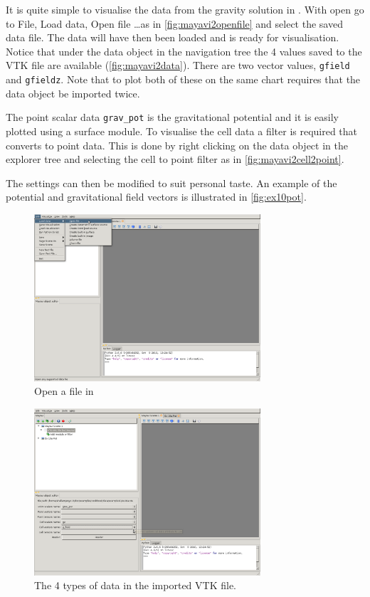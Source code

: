 It is quite simple to visualise the data from the gravity solution in \mayavi.
With \mayavi open go to File, Load data, Open file \ldots as in
\autoref{fig:mayavi2openfile} and select the saved data file. The data will
have then been loaded and is ready for visualisation. Notice that under the data
object in the \mayavi navigation tree the 4 values saved to the VTK file are
available (\autoref{fig:mayavi2data}). There are two vector values,
\verb|gfield| and \verb|gfieldz|. Note that to plot both of these on the same
chart requires that the data object be imported twice.

The point scalar data \verb|grav_pot| is the gravitational potential and it is
easily plotted using a surface module. To visualise the cell data a filter is
required that converts to point data. This is done by right clicking on the data
object in the explorer tree and selecting the cell to point filter as in
\autoref{fig:mayavi2cell2point}.

The settings can then be modified to suit personal taste. An example of the
potential and gravitational field vectors is illustrated in
\autoref{fig:ex10pot}.

\begin{figure}[ht]
\centering
\includegraphics[width=0.75\textwidth]{figures/mayavi2_openfile.png}
\caption{Open a file in \mayavi}
\label{fig:mayavi2openfile}
\end{figure}

\begin{figure}[ht]
\centering
\includegraphics[width=0.75\textwidth]{figures/mayavi2_data.png}
\caption{The 4 types of data in the imported VTK file.}
\label{fig:mayavi2data}
\end{figure}

